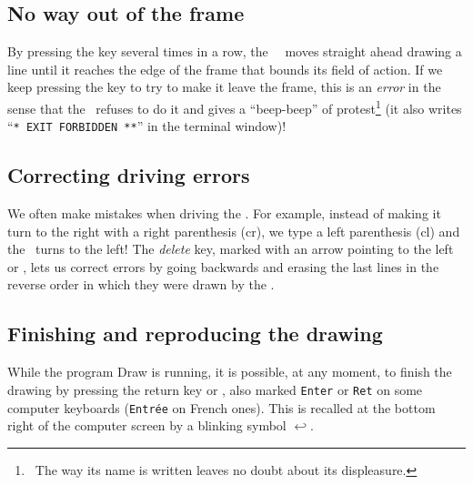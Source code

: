\subsection{No way out of the frame}

By pressing the key   several times in a row, the \robot\ \robotCbN\ moves straight ahead
drawing a line until it reaches the edge of the frame that bounds its field of action.
If we keep pressing the key
 to try to make it leave the frame, this is an {\em error}
in the sense that
the \robotErr\ refuses to do it and gives a
``beep-beep''
of
protest\@\footnote{\ The way its name is written
leaves no doubt about its displeasure.
} (it also writes
``{\tt ** EXIT FORBIDDEN **}''
in the terminal window)!

\subsection{Correcting driving errors}

 We often make mistakes when driving the \robotErr. For
example, instead of making it turn to the right with a
right parenthesis \touche{)} ({\idt cr}), we type a left parenthesis
\touche{(} ({\idt cl}) and the \robotErr\ turns
to the left! The {\em delete} key, marked with an arrow
pointing to the left 
\hspace{0.3ex}\framebox[11.mm][l]{$\leftarrow$~~~}\hspace{0.3ex}
or \hspace{0.3ex}\hspace{0.3ex},
lets us correct errors by going backwards and erasing
the last lines in the reverse order in which they were
drawn by the \robot.

\subsection{Finishing and reproducing the drawing}

While the program {\idt Draw} is running,
it is possible, at any moment, to
finish the drawing by pressing the return key
\hbox{\framebox[11.mm][l]{$\hookleftarrow$~~~}\hspace{0.3ex}}
or \hspace{0.3ex}\hspace{0.3ex}, also
marked {\small\tt Enter} or {\small\tt Ret} on some computer keyboards ({\small\tt Entrée} on French ones). This is recalled
at the bottom right of the computer screen by a blinking symbol
$\hookleftarrow$.

